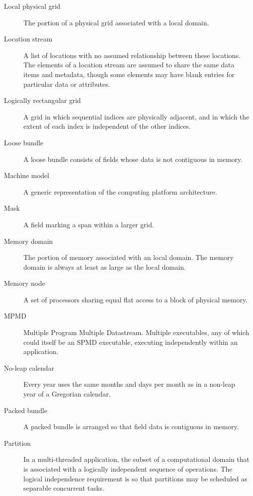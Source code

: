 \begin{description}
\item[Local physical grid] \label{glos:LocPhysGrid} The portion of a 
  physical grid associated with a local domain.  

\item[Location stream] \label{glos:LocStream} A list of
  locations with no assumed relationship between these locations.  The
  elements of a location stream are assumed to share the same data
  items and metadata, though some elements may have blank entries for
  particular data or attributes.

\item[Logically rectangular grid] \label{glos:RecGrid} A grid in 
  which sequential indices are physically adjacent, and in which the 
  extent of each index is independent of the other indices.

\item[Loose bundle] \label{glos:LooseBundle} A loose bundle consists of 
  fields whose data is not contiguous in memory.

\item[Machine model] A generic representation of the computing 
  platform architecture.

\item[Mask] \label{glos:Mask} A field marking a span within a larger grid.

\item[Memory domain] \label{glos:MemDomain} The portion of memory 
  associated with an local domain.  The memory domain is always at least 
  as large as the local domain.

\item[Memory node] \label{glos:Mnode} A set of processors
  sharing equal flat access to a block of physical memory.

\item[MPMD] \label{glos:MPMD} Multiple Program Multiple Datastream.
  Multiple executables, any of which could itself be an SPMD
  executable, executing independently within an application.

\item [No-leap calendar] \label{glos:NoLeap} Every year uses the same months 
and days per month as in a non-leap year of a Gregorian calendar.

\item[Packed bundle] \label{glos:PackedBundle} A packed bundle is arranged
  so that field data is contiguous in memory.

\item[Partition] \label{glos:Partition} In a multi-threaded application, the subset of a
  computational domain that is associated with a logically independent
  sequence of operations. The logical independence requirement is so
  that partitions may be scheduled as separable concurrent tasks.


\end{description}
